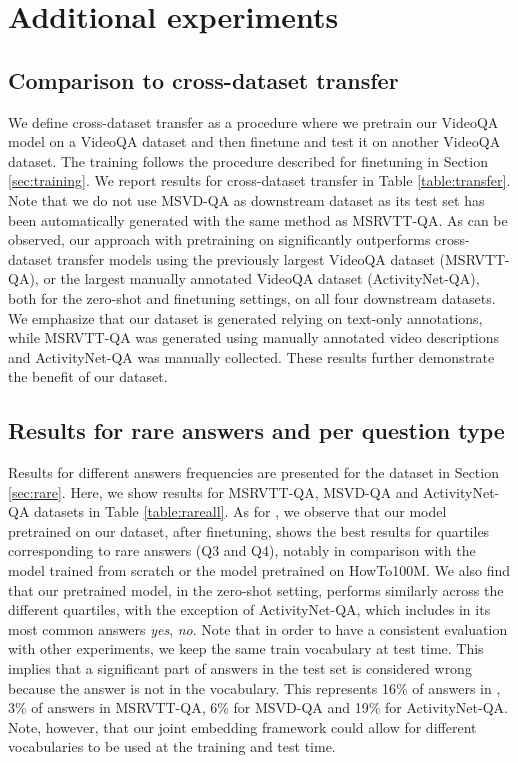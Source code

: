 \section{Additional experiments}\label{sec:expbis}

\subsection{Comparison to cross-dataset transfer}\label{sec:transfer}

We define cross-dataset transfer as a procedure where we pretrain our VideoQA model on a VideoQA dataset and then finetune and test it on another VideoQA dataset. 
The training follows the procedure described for finetuning in Section \ref{sec:training}. 
We report results for cross-dataset transfer in Table \ref{table:transfer}. Note that we do not use MSVD-QA as downstream dataset as its test set has been automatically generated with the same method \cite{heilman2010good} as MSRVTT-QA.
As can be observed, our approach with pretraining on \datasetname{} significantly outperforms cross-dataset transfer models using the previously largest VideoQA dataset (MSRVTT-QA), or the largest manually annotated VideoQA dataset (ActivityNet-QA), both for the zero-shot and finetuning settings, on all four downstream datasets.
We emphasize that our dataset is generated relying on text-only annotations, while MSRVTT-QA was generated using manually annotated video descriptions and ActivityNet-QA was manually collected.
These results further demonstrate the benefit of our \datasetname{} dataset.

\subsection{Results for rare answers and per question type}\label{sec:rarebis}
Results for different answers frequencies are presented for the \smalldatasetname{} dataset in Section \ref{sec:rare}. 
Here, we show results for MSRVTT-QA, MSVD-QA and ActivityNet-QA datasets in Table \ref{table:rareall}. 
As for \smalldatasetname{}, we observe that our model pretrained on our \datasetname{} dataset, after finetuning, shows the best results for quartiles corresponding to rare answers (Q3 and Q4), notably in comparison with the model trained from scratch or the model pretrained on HowTo100M.
We also find that our pretrained model, in the zero-shot setting, performs similarly across the different quartiles, with the exception of ActivityNet-QA, which includes in its most common answers \textit{yes}, \textit{no}.
Note that in order to have a consistent evaluation with other experiments, we keep the same train vocabulary at test time. 
This implies that a significant part of answers in the test set is considered wrong because the answer is not in the vocabulary. 
This represents 16\% of answers in \smalldatasetname{}, 3\% of answers in MSRVTT-QA, 6\% for MSVD-QA and 19\% for ActivityNet-QA. 
Note, however, that our joint embedding framework could allow for different vocabularies to be used at the training and test time. 

